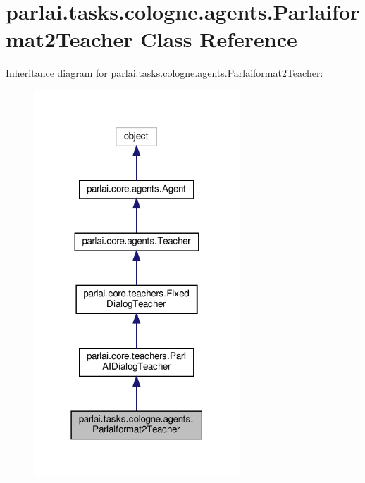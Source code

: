 \hypertarget{classparlai_1_1tasks_1_1cologne_1_1agents_1_1Parlaiformat2Teacher}{}\section{parlai.\+tasks.\+cologne.\+agents.\+Parlaiformat2\+Teacher Class Reference}
\label{classparlai_1_1tasks_1_1cologne_1_1agents_1_1Parlaiformat2Teacher}


Inheritance diagram for parlai.\+tasks.\+cologne.\+agents.\+Parlaiformat2\+Teacher\+:
\nopagebreak
\begin{figure}[H]
\begin{center}
\leavevmode
\includegraphics[width=219pt]{d7/d73/classparlai_1_1tasks_1_1cologne_1_1agents_1_1Parlaiformat2Teacher__inherit__graph}
\end{center}
\end{figure}


